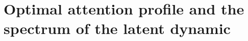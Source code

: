 \documentclass{article}
\begin{document}
\section{Optimal attention profile and the spectrum of the latent dynamic}




\end{document}
